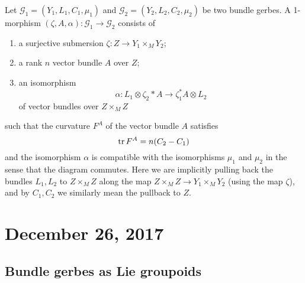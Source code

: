 \documentclass{amsart}
\begin{document}
Let $\mathcal{G}_1=(Y_1, L_1, C_1, \mu_1)$ and $\mathcal{G}_2=(Y_2, L_2, C_2, \mu_2)$
be two bundle gerbes. A 1-morphism $(\zeta, A, \alpha):\mathcal{G}_1\to \mathcal{G}_2$
consists of
\begin{enumerate}
    \item a surjective submersion $\zeta: Z\to Y_1\times_M Y_2$;
    \item a rank $n$ vector bundle $A$ over $Z$;
    \item an isomorphism
        \begin{equation*}
            \alpha : L_1\otimes \zeta_2*A \to \zeta_1^*A\otimes L_2
        \end{equation*}
        of vector bundles over $Z\times_MZ$
\end{enumerate}
such that the curvature $F^A$ of the vector bundle $A$ satisfies
\begin{equation*}
    \operatorname{tr} F^A = n(C_2-C_1)
\end{equation*}
and the isomorphism $\alpha$ is compatible with the isomorphisms $\mu_1$ and $\mu_2$
in the sense that the diagram
commutes. Here we are implicitly pulling back the bundles $L_1, L_2$ to $Z\times_M Z$
along the map $Z\times_MZ\to Y_1\times_M Y_2$ (using the map $\zeta$), and by $C_1,C_2$
we similarly mean the pullback to $Z$.

\section{December 26, 2017}

\subsection{Bundle gerbes as Lie groupoids}
\end{document}
